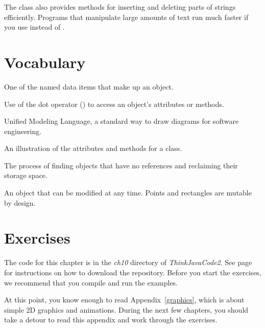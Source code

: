 The  class also provides methods for inserting and deleting parts of strings efficiently.
Programs that manipulate large amounts of text run much faster if you use  instead of .


\section{Vocabulary}
\label{mutable-objects_vocabulary}

\begin{description}

One of the named data items that make up an object.

Use of the dot operator () to access an object's attributes or methods.

Unified Modeling Language, a standard way to draw diagrams for software engineering.

An illustration of the attributes and methods for a class.


The process of finding objects that have no references and reclaiming their storage space.

An object that can be modified at any time.
Points and rectangles are mutable by design.

\end{description}


\section{Exercises}
\label{mutable-objects_exercises}

The code for this chapter is in the {\it ch10} directory of {\it ThinkJavaCode2}.
See page~\pageref{code} for instructions on how to download the repository.
Before you start the exercises, we recommend that you compile and run the examples.

At this point, you know enough to read Appendix~\ref{graphics}, which is about simple 2D graphics and animations.
During the next few chapters, you should take a detour to read this appendix and work through the exercises.


